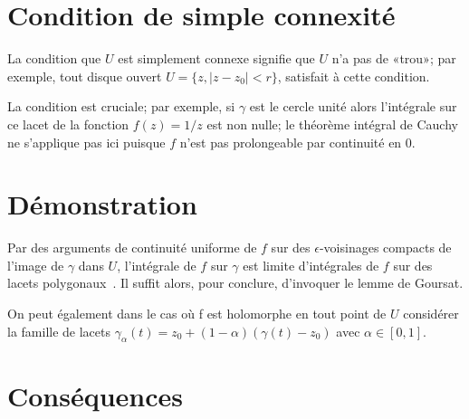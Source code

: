 \documentclass{aomart}
\begin{document}
\section{Condition de simple connexité}

La condition que $U$ est simplement connexe signifie que $U$ n'a pas
de «trou»; par exemple, tout disque ouvert
$U=\{z,\mid z-z_{0}\mid <r\}$, satisfait à cette condition.

La condition est cruciale; par exemple, si $\gamma$ est le cercle
unité alors l'intégrale sur ce lacet de la fonction $f(z) = 1/z$ est
non nulle; le théorème intégral de Cauchy ne s'applique pas ici
puisque $f$ n'est pas prolongeable par continuité en $0$.

\section{Démonstration}

Par des arguments de continuité uniforme de $f$ sur des
$\epsilon$-voisinages compacts de l'image de $\gamma$ dans $U$,
l'intégrale de $f$ sur $\gamma$ est limite d'intégrales de $f$ sur des
lacets polygonaux~\cite[p.~111]{Hahn96}. Il suffit alors, pour
conclure, d'invoquer le lemme de Goursat.

On peut également dans le cas où f est holomorphe en tout point de $U$
considérer la famille de lacets  $\gamma _{{\alpha
  }}(t)=z_{0}+(1-\alpha )(\gamma (t)-z_{0})$ avec $\alpha \in [0,1]$.

\section{Conséquences}
\end{document}

